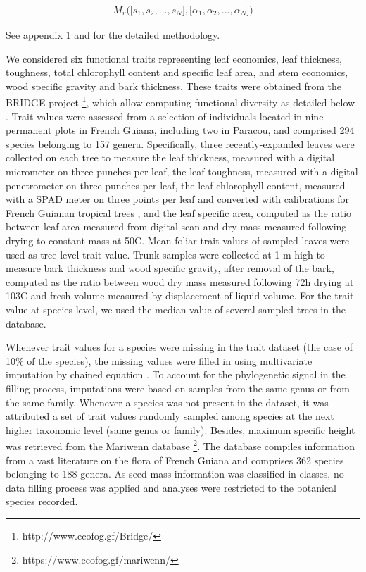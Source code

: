 \documentclass[fleqn,10pt]{ArtEcoFoG} %
\begin{document}
\begin{align}
M_v\Big(\big[s_1, s_2,..., s_N\big],\big[\alpha_1, \alpha_2,..., \alpha_N\big]\Big) \nonumber
\end{align}

See appendix 1 and \citet{Aubry-Kientz2013} for the detailed methodology.

We considered six functional traits representing leaf economics, leaf thickness, toughness, total chlorophyll content and specific leaf area, and stem economics, wood specific gravity and bark thickness. These traits were obtained from the BRIDGE project \footnote{http://www.ecofog.gf/Bridge/}, which allow computing functional diversity as detailed below \citep{Paine2015}.
Trait values were assessed from a selection of individuals located in nine permanent plots in French Guiana, including two in Paracou, and comprised 294 species belonging to 157 genera. Specifically, three recently-expanded leaves were collected on each tree to measure the leaf thickness, measured with a digital micrometer on three punches per leaf, the leaf toughness, measured with a digital penetrometer on three punches per leaf, the leaf chlorophyll content, measured with a SPAD meter on three points per leaf and converted with calibrations for French Guianan tropical trees \citep{Coste2010}, and the leaf specific area, computed as the ratio between leaf area measured from digital scan and dry mass measured following drying to constant mass at 50\textdegree C. Mean foliar trait values of sampled leaves were used as tree-level trait value. Trunk samples were collected at 1 m high to measure bark thickness and wood specific gravity, after removal of the bark, computed as the ratio between wood dry mass measured following 72h drying at 103\textdegree C and fresh volume measured by displacement of liquid volume. For the trait value at species level, we used the median value of several sampled trees in the database.

Whenever trait values for a species were missing in the trait dataset (the case of 10\% of the species), the missing values were filled in using multivariate imputation by chained equation \citep{Mice2011}.
To account for the phylogenetic signal in the filling process, imputations were based on samples from the same genus or from the same family. Whenever a species was not present in the dataset, it was attributed a set of trait values randomly sampled among species at the next higher taxonomic level (same genus or family).
Besides, maximum specific height was retrieved from the Mariwenn database \footnote{https://www.ecofog.gf/mariwenn/}.
The database compiles information from a vast literature on the flora of French Guiana \citep{Ollivier2007} and comprises 362 species belonging to 188 genera. As seed mass information was classified in classes, no data filling process was applied and analyses were restricted to the botanical species recorded.
\end{document}
